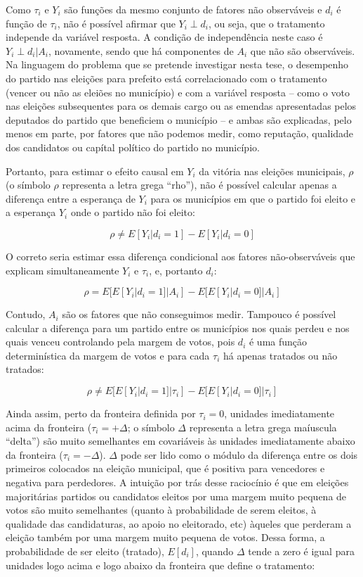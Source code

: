 Como $\tau_{i}$ e $Y_{i}$ são funções da mesmo conjunto de fatores não observáveis e $d_{i}$ é função de $\tau_{i}$, não é possível afirmar que $Y_{i} \perp d_{i}$, ou seja, que o tratamento independe da variável resposta. A condição de independência neste caso é $Y_{i} \perp d_{i} | A_{i}$, novamente, sendo que há componentes de $A_{i}$ que não são observáveis. Na linguagem do problema que se pretende investigar nesta tese, o desempenho do partido nas eleições para prefeito está correlacionado com o tratamento (vencer ou não as eleiões no município) e com a variável resposta -- como o voto nas eleições subsequentes para os demais cargo ou as emendas apresentadas pelos deputados do partido que beneficiem o município -- e ambas são explicadas, pelo menos em parte, por fatores que não podemos medir, como reputação, qualidade dos candidatos ou capítal político do partido no município.

Portanto, para estimar o efeito causal em $Y_{i}$ da vitória nas eleições municipais, $\rho$ (o símbolo $\rho$ representa a letra grega ``rho''), não é possível calcular apenas a diferença entre a esperança de $Y_{i}$ para os municípios em que o partido foi eleito e a esperança $Y_{i}$ onde o partido não foi eleito:\newline

\[\rho \ne E[Y_{i}|d_{i}=1] - E[Y_{i}|d_{i}=0]\]

O correto seria estimar essa diferença condicional aos fatores não-observáveis que explicam simultaneamente $Y_{i}$ e $\tau_{i}$, e, portanto $d_{i}$:

\[\rho = E[E[Y_{i}|d_{i}=1]|A_{i}] - E[E[Y_{i}|d_{i}=0]|A_{i}]\]

Contudo, $A_{i}$ são os fatores que não conseguimos medir. Tampouco é possível calcular a diferença para um partido entre os municípios nos quais perdeu e nos quais venceu controlando pela margem de votos, pois $d_{i}$ é uma função determinística da margem de votos e para cada $\tau_{i}$ há apenas tratados ou não tratados:

\[\rho \ne E[E[Y_{i}|d_{i}=1]|\tau_{i}] - E[E[Y_{i}|d_{i}=0]|\tau_{i}]\]

Ainda assim, perto da fronteira definida por $\tau_{i}=0$, unidades imediatamente acima da fronteira ($\tau_{i}=+\Delta$; o símbolo $\Delta$ representa a letra grega maíuscula ``delta'') são muito semelhantes em covariáveis às unidades imediatamente abaixo da fronteira ($\tau_{i}=-\Delta$). $\Delta$ pode ser lido como o módulo da diferença entre os dois primeiros colocados na eleição municipal, que é positiva para vencedores e negativa para perdedores. A intuição por trás desse raciocínio é que em eleições majoritárias partidos ou candidatos eleitos por uma margem muito pequena de votos são muito semelhantes (quanto à probabilidade de serem eleitos, à qualidade das candidaturas, ao apoio no eleitorado, etc) àqueles que perderam a eleição também por uma margem muito pequena de votos. Dessa forma, a probabilidade de ser eleito (tratado), $E[d_{i}]$, quando $\Delta$ tende a zero é igual para unidades logo acima e logo abaixo da fronteira que define o tratamento:

